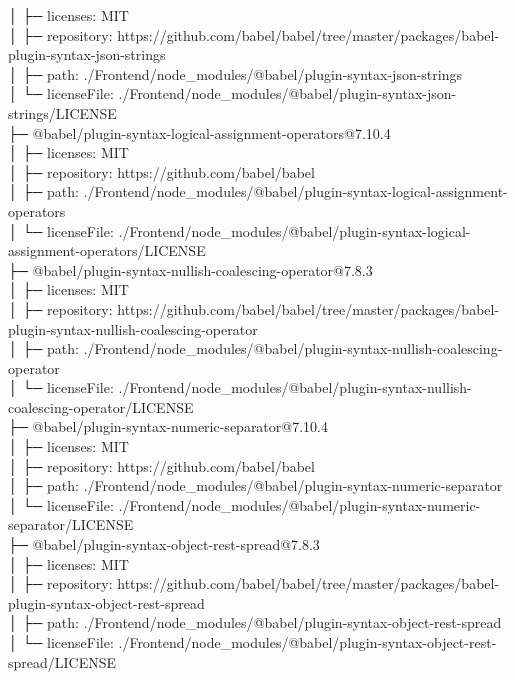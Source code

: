 │  ├─ licenses: MIT\\
│  ├─ repository: https://github.com/babel/babel/tree/master/packages/babel-plugin-syntax-json-strings\\
│  ├─ path: ./Frontend/node\_modules/@babel/plugin-syntax-json-strings\\
│  └─ licenseFile: ./Frontend/node\_modules/@babel/plugin-syntax-json-strings/LICENSE\\
├─ @babel/plugin-syntax-logical-assignment-operators@7.10.4\\
│  ├─ licenses: MIT\\
│  ├─ repository: https://github.com/babel/babel\\
│  ├─ path: ./Frontend/node\_modules/@babel/plugin-syntax-logical-assignment-operators\\
│  └─ licenseFile: ./Frontend/node\_modules/@babel/plugin-syntax-logical-assignment-operators/LICENSE\\
├─ @babel/plugin-syntax-nullish-coalescing-operator@7.8.3\\
│  ├─ licenses: MIT\\
│  ├─ repository: https://github.com/babel/babel/tree/master/packages/babel-plugin-syntax-nullish-coalescing-operator\\
│  ├─ path: ./Frontend/node\_modules/@babel/plugin-syntax-nullish-coalescing-operator\\
│  └─ licenseFile: ./Frontend/node\_modules/@babel/plugin-syntax-nullish-coalescing-operator/LICENSE\\
├─ @babel/plugin-syntax-numeric-separator@7.10.4\\
│  ├─ licenses: MIT\\
│  ├─ repository: https://github.com/babel/babel\\
│  ├─ path: ./Frontend/node\_modules/@babel/plugin-syntax-numeric-separator\\
│  └─ licenseFile: ./Frontend/node\_modules/@babel/plugin-syntax-numeric-separator/LICENSE\\
├─ @babel/plugin-syntax-object-rest-spread@7.8.3\\
│  ├─ licenses: MIT\\
│  ├─ repository: https://github.com/babel/babel/tree/master/packages/babel-plugin-syntax-object-rest-spread\\
│  ├─ path: ./Frontend/node\_modules/@babel/plugin-syntax-object-rest-spread\\
│  └─ licenseFile: ./Frontend/node\_modules/@babel/plugin-syntax-object-rest-spread/LICENSE\\
